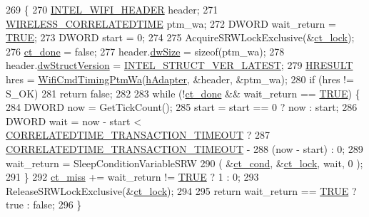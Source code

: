 \begin{DoxyCode}
269                                                      \{
270     \hyperlink{struct___i_n_t_e_l___w_i_f_i___h_e_a_d_e_r}{INTEL\_WIFI\_HEADER} header;
271     \hyperlink{struct___w_i_r_e_l_e_s_s___c_o_r_r_e_l_a_t_e_d_t_i_m_e}{WIRELESS\_CORRELATEDTIME} ptm\_wa;
272     DWORD wait\_return = \hyperlink{maap__log_8h_aa8cecfc5c5c054d2875c03e77b7be15d}{TRUE};
273     DWORD start = 0;
274 
275     AcquireSRWLockExclusive(&\hyperlink{class_intel_wireless_adapter_a5fa67f021cca2b2c598bbc494b119fe9}{ct\_lock});
276     \hyperlink{class_intel_wireless_adapter_ab7386280881b5fe0d79562d65f42152b}{ct\_done} = \textcolor{keyword}{false};
277     header.\hyperlink{struct___i_n_t_e_l___w_i_f_i___h_e_a_d_e_r_a669c5a85f5a9eb97e64ad880fadaaa2d}{dwSize} = \textcolor{keyword}{sizeof}(ptm\_wa);
278     header.\hyperlink{struct___i_n_t_e_l___w_i_f_i___h_e_a_d_e_r_a1955a5d9a8f0620b32d679505ea5b0ae}{dwStructVersion} = \hyperlink{intel__wireless_8hpp_aeb30ed191fda90ec49ca8f802bb2299d}{INTEL\_STRUCT\_VER\_LATEST};
279     \hyperlink{intel__wireless_8hpp_af4eacc2ae01b6cc02946c0598187bc50}{HRESULT} hres = \hyperlink{intel__wireless_8cpp_aeb01f9db493ae3b99af76be36d47eda8}{WifiCmdTimingPtmWa}(\hyperlink{class_intel_wireless_adapter_a691881600d67a63fef617bf58a70736c}{hAdapter}, &header, &ptm\_wa);
280     \textcolor{keywordflow}{if} (hres != S\_OK)
281         \textcolor{keywordflow}{return} \textcolor{keyword}{false};
282 
283     \textcolor{keywordflow}{while} (!\hyperlink{class_intel_wireless_adapter_ab7386280881b5fe0d79562d65f42152b}{ct\_done} && wait\_return == \hyperlink{maap__log_8h_aa8cecfc5c5c054d2875c03e77b7be15d}{TRUE}) \{
284         DWORD now = GetTickCount();
285         start = start == 0 ? now : start;
286         DWORD wait = now - start < \hyperlink{intel__wireless_8hpp_a68036017ea29ea9c9dfb7a13cd180c59}{CORRELATEDTIME\_TRANSACTION\_TIMEOUT} ?
287                        \hyperlink{intel__wireless_8hpp_a68036017ea29ea9c9dfb7a13cd180c59}{CORRELATEDTIME\_TRANSACTION\_TIMEOUT} -
288                        (now - start) : 0;
289         wait\_return = SleepConditionVariableSRW
290                        ( &\hyperlink{class_intel_wireless_adapter_abf7f0ddf827ae4bd5c82ab47f06e5328}{ct\_cond}, &\hyperlink{class_intel_wireless_adapter_a5fa67f021cca2b2c598bbc494b119fe9}{ct\_lock}, wait, 0 );
291     \}
292     \hyperlink{class_intel_wireless_adapter_a8926532f4aef8773a0afb7646863188a}{ct\_miss} += wait\_return != \hyperlink{maap__log_8h_aa8cecfc5c5c054d2875c03e77b7be15d}{TRUE} ? 1 : 0;
293     ReleaseSRWLockExclusive(&\hyperlink{class_intel_wireless_adapter_a5fa67f021cca2b2c598bbc494b119fe9}{ct\_lock});
294 
295     \textcolor{keywordflow}{return} wait\_return == \hyperlink{maap__log_8h_aa8cecfc5c5c054d2875c03e77b7be15d}{TRUE} ? \textcolor{keyword}{true} : \textcolor{keyword}{false};
296 \}
\end{DoxyCode}


